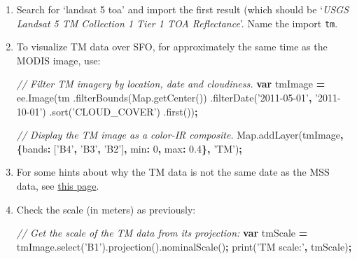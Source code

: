 \documentclass[
]{article}
\newenvironment{Shaded}{\begin{snugshade}}{\end{snugshade}}
\newcommand{\AttributeTok}[1]{\textcolor[rgb]{0.77,0.63,0.00}{#1}}
\newcommand{\CommentTok}[1]{\textcolor[rgb]{0.56,0.35,0.01}{\textit{#1}}}
\newcommand{\DataTypeTok}[1]{\textcolor[rgb]{0.13,0.29,0.53}{#1}}
\newcommand{\DecValTok}[1]{\textcolor[rgb]{0.00,0.00,0.81}{#1}}
\newcommand{\FloatTok}[1]{\textcolor[rgb]{0.00,0.00,0.81}{#1}}
\newcommand{\KeywordTok}[1]{\textcolor[rgb]{0.13,0.29,0.53}{\textbf{#1}}}
\newcommand{\NormalTok}[1]{#1}
\newcommand{\OperatorTok}[1]{\textcolor[rgb]{0.81,0.36,0.00}{\textbf{#1}}}
\newcommand{\StringTok}[1]{\textcolor[rgb]{0.31,0.60,0.02}{#1}}
\newcommand{\VariableTok}[1]{\textcolor[rgb]{0.00,0.00,0.00}{#1}}
\begin{document}
\begin{enumerate}
\def\labelenumi{\arabic{enumi}.}
\item
  Search for `landsat 5 toa' and import the first result (which should be `\emph{USGS Landsat 5 TM Collection 1 Tier 1 TOA Reflectance}'. Name the import \texttt{tm}.
\item
  To visualize TM data over SFO, for approximately the same time as the MODIS image, use:

\begin{Shaded}
\begin{Highlighting}[]

\CommentTok{// Filter TM imagery by location, date and cloudiness.}
\KeywordTok{var}\NormalTok{ tmImage }\OperatorTok{=} \VariableTok{ee}\NormalTok{.}\AttributeTok{Image}\NormalTok{(tm}
\NormalTok{            .}\AttributeTok{filterBounds}\NormalTok{(}\VariableTok{Map}\NormalTok{.}\AttributeTok{getCenter}\NormalTok{())}
\NormalTok{            .}\AttributeTok{filterDate}\NormalTok{(}\StringTok{'2011-05-01'}\OperatorTok{,} \StringTok{'2011-10-01'}\NormalTok{)}
\NormalTok{            .}\AttributeTok{sort}\NormalTok{(}\StringTok{'CLOUD_COVER'}\NormalTok{)}
\NormalTok{            .}\AttributeTok{first}\NormalTok{())}\OperatorTok{;}

\CommentTok{// Display the TM image as a color-IR composite.}
\VariableTok{Map}\NormalTok{.}\AttributeTok{addLayer}\NormalTok{(tmImage}\OperatorTok{,} \OperatorTok{\{}\DataTypeTok{bands}\OperatorTok{:}\NormalTok{ [}\StringTok{'B4'}\OperatorTok{,} \StringTok{'B3'}\OperatorTok{,} \StringTok{'B2'}\NormalTok{]}\OperatorTok{,} \DataTypeTok{min}\OperatorTok{:} \DecValTok{0}\OperatorTok{,} \DataTypeTok{max}\OperatorTok{:} \FloatTok{0.4}\OperatorTok{\},} \StringTok{'TM'}\NormalTok{)}\OperatorTok{;} 
\end{Highlighting}
\end{Shaded}
\item
  For some hints about why the TM data is not the same date as the MSS data, see \href{https://www.usgs.gov/core-science-systems/nli/landsat/landsat-5?qt-science_support_page_related_con=0\#qt-science_support_page_related_con}{this page}.
\item
  Check the scale (in meters) as previously:

\begin{Shaded}
\begin{Highlighting}[]
\CommentTok{// Get the scale of the TM data from its projection:}
\KeywordTok{var}\NormalTok{ tmScale }\OperatorTok{=} \VariableTok{tmImage}\NormalTok{.}\AttributeTok{select}\NormalTok{(}\StringTok{'B1'}\NormalTok{).}\AttributeTok{projection}\NormalTok{().}\AttributeTok{nominalScale}\NormalTok{()}\OperatorTok{;}
\AttributeTok{print}\NormalTok{(}\StringTok{'TM scale:'}\OperatorTok{,}\NormalTok{ tmScale)}\OperatorTok{;}
\end{Highlighting}
\end{Shaded}
\end{enumerate}
\end{document}
